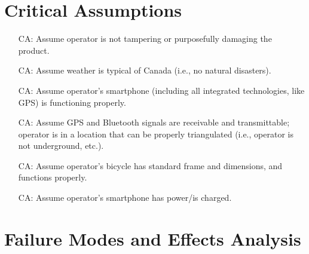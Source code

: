 \documentclass{article}
\newcounter{canum} %
\begin{document}
\section{Critical Assumptions}

\begin{itemize}

\item[CA\refstepcounter{canum}\thecanum\label{CA1}:] Assume operator is not tampering or purposefully damaging the product.
\item[CA\refstepcounter{canum}\thecanum\label{CA2}:] Assume weather is typical of Canada (i.e., no natural disasters).
\item[CA\refstepcounter{canum}\thecanum\label{CA3}:] Assume operator's smartphone (including all integrated technologies, like GPS) is functioning properly.
\item[CA\refstepcounter{canum}\thecanum\label{CA4}:] Assume GPS and Bluetooth signals are receivable and transmittable; operator is in a location that can be properly triangulated (i.e., operator is not underground, etc.). 
\item[CA\refstepcounter{canum}\thecanum\label{CA5}:] Assume operator's bicycle has standard frame and dimensions, and functions properly.
\item[CA\refstepcounter{canum}\thecanum\label{CA6}:] Assume operator's smartphone has power/is charged. 

\end{itemize}

\section{Failure Modes and Effects Analysis}

\newpage
\end{document}
